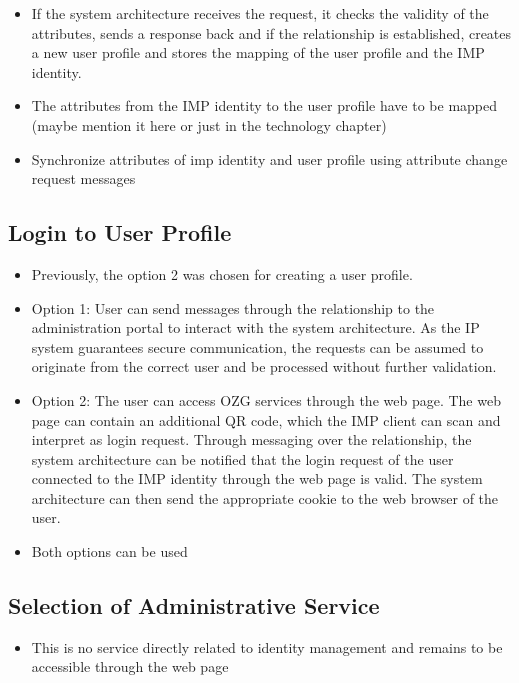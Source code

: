 \begin{itemize}
\begin{itemize}
    \end{itemize}
    \item If the system architecture receives the request, it checks the validity of the attributes, sends a response back and if the relationship is established, creates a new user profile and stores the mapping of the user profile and the IMP identity.
    \item The attributes from the IMP identity to the user profile have to be mapped (maybe mention it here or just in the technology chapter)
    \item Synchronize attributes of imp identity and user profile using attribute change request messages
\end{itemize}

\subsection{Login to User Profile}
\begin{itemize}
    \item Previously, the option 2 was chosen for creating a user profile.
    \item Option 1: User can send messages through the relationship to the administration portal to interact with the system architecture. As the IP system guarantees secure communication, the requests can be assumed to originate from the correct user and be processed without further validation.
    \item Option 2: The user can access OZG services through the web page. The web page can contain an additional QR code, which the IMP client can scan and interpret as login request. Through messaging over the relationship, the system architecture can be notified that the login request of the user connected to the IMP identity through the web page is valid. The system architecture can then send the appropriate cookie to the web browser of the user.
    \item Both options can be used
\end{itemize}

\subsection{Selection of Administrative Service}
\begin{itemize}
    \item This is no service directly related to identity management and remains to be accessible through the web page
\end{itemize}

